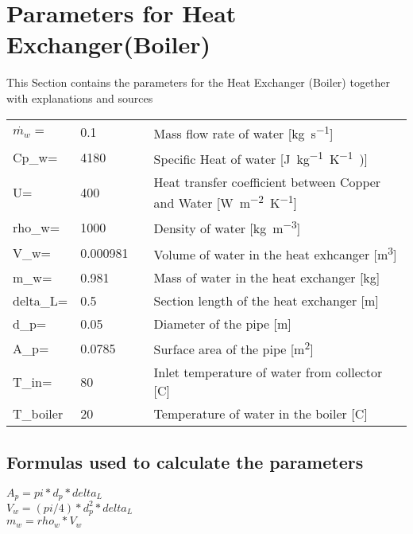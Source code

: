 \section{Parameters for Heat Exchanger(Boiler)} 

This Section contains the parameters for the Heat Exchanger (Boiler) together with explanations and sources 

\begin{tabular}{ l l |c| l} 
	$ \dot{m_{w}}=$		&0.1        &                                          &Mass flow rate of water [\si{kg.s^{-1}}]\\     	
	Cp_{w}=	           	&4180	    &\cite{SpecificHeat}	                   &Specific Heat of water [\si{J.kg^{-1}.K^{-1})}]\\     
	U=		            &400	    &\cite{HeatTransferCoefficient}	           &Heat transfer coefficient between Copper and Water [\si{W.m^{-2}.K^{-1}}] \\
	rho_{w}=	     	&1000	    &\cite{WaterDensity}	                   &Density of water [\si{kg.m^{-3}}] \\
	V_{w}=		        &0.000981	&                                          &Volume of water in the heat exhcanger [\si{m^{3}}]  \\
	m_{w}=	          	&0.981		&                                          &Mass of water in the heat exchanger [\si{kg}]  \\
	delta_L=	    	&0.5		&                                          &Section length of the heat exchanger [\si{m}]  \\
	d_{p}=		        &0.05		&                                          &Diameter of the pipe [\si{m}]  \\
	A_{p}=	         	&0.0785		&                                          &Surface area of the pipe [\si{m^{2}}]  \\
	T_{in}=		        &80	        &                                          &Inlet temperature of water from collector [\si{C}]  \\
	T_{boiler}          &20         &                                          &Temperature of water in the boiler [\si{C}] \\		
\end{tabular}

\subsection{Formulas used to calculate the parameters}

    $ A_{p}=pi*d_{p}*delta_L $ \\
    $ V_{w}=(pi/4)*d_{p}^{2}*delta_L $ \\
    $ m_{w}=rho_{w}* V_{w} $ \\
